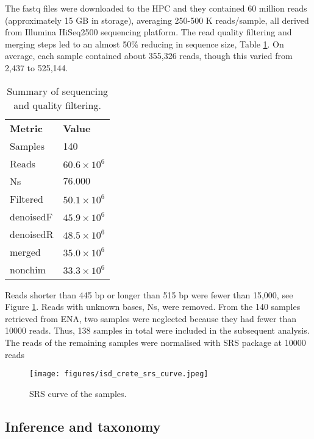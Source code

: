 The fastq files were downloaded to the HPC and they contained 60 million reads (approximately 15 GB in storage),
averaging 250-500 K reads/sample, all derived from Illumina HiSeq2500 sequencing platform.
The read quality filtering and merging steps led to an almost 50\% reducing in sequence size, Table \ref{tab:metrics}. 
On average, each sample contained about 355,326 reads, though this varied from
2,437 to 525,144.

\begin{table}[h!]
\centering
\caption{Summary of sequencing and quality filtering.}
\begin{tabular}{@{}ll@{}}
\textbf{Metric} & \textbf{Value}     \\
Samples         & 140                \\
Reads           & $60.6 \times 10^6$ \\
Ns              & $76.000$           \\
Filtered        & $50.1 \times 10^6$ \\
denoisedF       & $45.9 \times 10^6$ \\
denoisedR       & $48.5 \times 10^6$ \\
merged          & $35.0 \times 10^6$ \\
nonchim         & $33.3 \times 10^6$ \\
\end{tabular}
\label{tab:metrics}
\end{table}

Reads shorter than 445 bp or longer than 515 bp were fewer than
15,000, see Figure \ref{fig:isd_srs-curve_samples}.
Reads with unknown bases, Ns, were removed.
From the 140 samples retrieved from ENA, two samples were 
neglected because they had fewer than 10000 reads.
Thus, 138 samples in total were included in the subsequent analysis.
The reads of the remaining samples were normalised with SRS package at 10000 reads \parencite{Beule2020}
   
   \begin{figure}[hbt!]
      \centering
      \texttt{[image: figures/isd\_crete\_srs\_curve.jpeg]}
      \caption[SRS curve]{SRS curve of the samples. }
      \label{fig:isd_srs-curve_samples}
   \end{figure}

\subsection{Inference and taxonomy}\label{inference_taxonomy}

